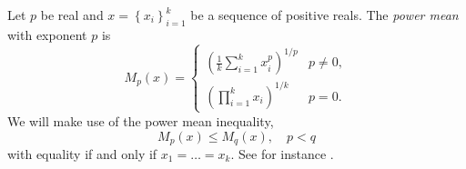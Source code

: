 \documentclass{article}
\theoremstyle{plain}
\theoremstyle{plain}
\theoremstyle{definition}
\theoremstyle{remark}
\theoremstyle{definition}
\theoremstyle{plain}
\theoremstyle{plain}
\theoremstyle{definition}
\begin{document}

Let $p$ be real and $x=\left\{ x_{i}\right\} _{i=1}^{k}$ be a sequence
of positive reals. The \emph{power mean} with exponent $p$ is
\[
M_{p}\left(x\right)=\begin{cases}
\left(\frac{1}{k}\sum_{i=1}^{k}x_{i}^{p}\right)^{1/p} & p\neq0,\\
\left(\prod_{i=1}^{k}x_{i}\right)^{1/k} & p=0.
\end{cases}
\]
We will make use of the power mean inequality,
\begin{equation}
M_{p}\left(x\right)\leq M_{q}\left(x\right),\quad p<q\label{eq:generalized mean inequality}
\end{equation}
with equality if and only if $x_{1}=\ldots=x_{k}$. See for instance \citep[][Chapter III]{Bullen2013-os}.
\end{document}
